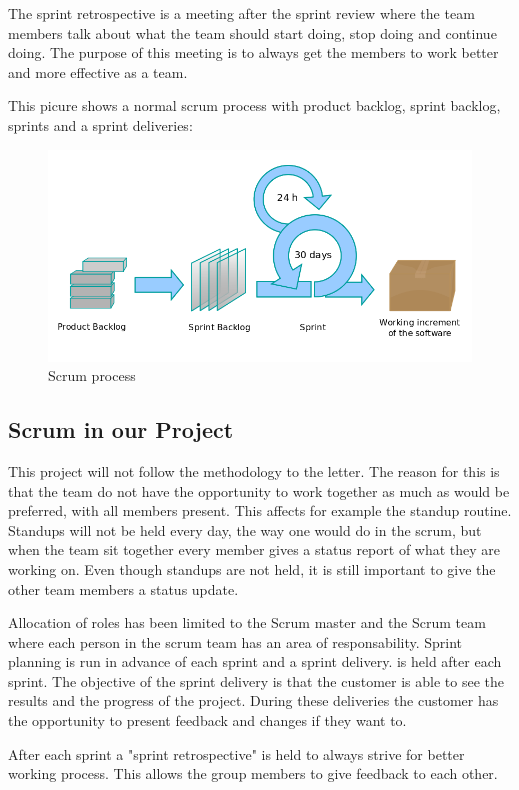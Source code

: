 The sprint retrospective is a meeting after the sprint review where the team members talk about what 
the team should start doing, stop doing and continue doing. The purpose of this meeting is to always 
get the members to work better and more effective as a team. \cite{wikiAgile}

This picure shows a normal scrum process with product backlog, sprint backlog, 
sprints and a sprint deliveries:

\begin{figure}[!ht]
    \includegraphics[scale=0.4]{pictures/Scrumprocess.png}
    \caption{Scrum process}
\end{figure}

\subsection*{Scrum in our Project}

This project will not follow the methodology to the letter. The reason for this is that the team do 
not have the opportunity to work together as much as would be preferred, with all members present. This affects
for example the standup routine. Standups will not be held every day, the way one would do in the scrum,
but when the team sit together every member gives a status report of what they are working on. Even though standups are not held, it is still important to give the other team members a status update.

Allocation of roles has been limited to the Scrum master and the Scrum team where each person in the scrum team has an area of responsability. Sprint planning is run in advance of each sprint and a sprint delivery.
is held after each sprint. The objective of the sprint delivery is that the customer is able to see the results and the progress of the project. During these deliveries the customer has the opportunity to present feedback and changes 
if they want to.

After each sprint a "sprint retrospective" is held to always strive for better working 
process. This allows the group members to give feedback to each other.

